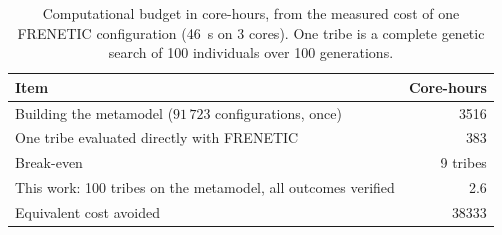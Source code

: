 \begin{table}[htbp]
\centering
\caption{Computational budget in core-hours, from the measured cost of one
FRENETIC configuration (46~s on 3 cores). One tribe is a complete genetic
search of 100 individuals over 100 generations.}
\label{tab:cost}
\begin{tabular}{lr}
\hline
Item & Core-hours \\ \hline
Building the metamodel ($91\,723$ configurations, once) & 3516 \\
One tribe evaluated directly with FRENETIC & 383 \\
Break-even & 9 tribes \\ \hline
This work: 100 tribes on the metamodel, all outcomes verified & 2.6 \\
Equivalent cost avoided & 38333 \\ \hline
\end{tabular}
\end{table}
